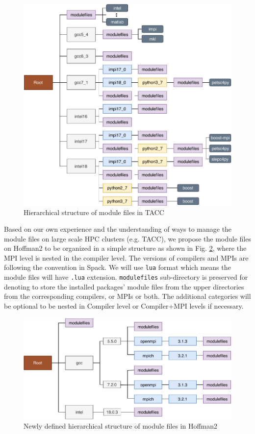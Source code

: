 \documentclass[conference]{IEEEtran}
\begin{document}
\begin{figure}[htbp]
  \centerline{\includegraphics[width=\linewidth]{figures/tacc_hier}}
  \caption{Hierarchical structure of module files in TACC}
  \label{fig:tacc_hier}
\end{figure}

Based on our own experience and the understanding of ways to manage the module files on large scale HPC clusters (e.g. TACC), we propose the module files on Hoffman2 to be organized in a simple structure as shown in Fig. \ref{fig:h2_new_hier}, where the MPI level is nested in the compiler level. 
The versions of compilers and MPIs are following the convention in Spack. 
We will use \texttt{lua} format which means the module files will have \texttt{.lua} extension. 
\texttt{modulefiles} sub-directory is preserved for denoting to store the installed packages' module files from the upper directories from the corresponding compilers, or MPIs or both. The additional categories will be optional to be nested in Compiler level or Compiler+MPI levels if necessary. 

\begin{figure}[htbp]
  \centerline{\includegraphics[width=\linewidth]{figures/h2_new_hier}}
  \caption{Newly defined hierarchical structure of module files in Hoffman2}
  \label{fig:h2_new_hier}
\end{figure}
\end{document}
